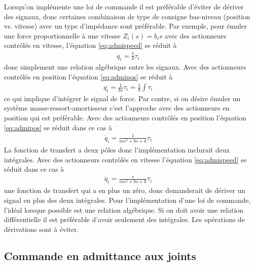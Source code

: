 Lorsqu'on implémente une loi de commande il est préférable d'éviter de dériver des signaux, donc certaines combinaison de type de consigne bas-niveau (position vs. vitesse) avec un type d'impédance sont préférable. Par exemple, pour émuler une force proportionnelle à une vitesse $Z_i(s) = b_i s$ avec des actionneurs contrôlés en vitesse, l'équation \eqref{eq:admispeed} se réduit à 
\begin{align}
\dot{q}_i = \frac{1}{b} \tau_i
\end{align}
donc simplement une relation algébrique entre les signaux. Avec des actionneurs contrôlés en position l'équation \eqref{eq:admipos} se réduit à 
\begin{align}
q_i = \frac{1}{b s} \tau_i = \frac{1}{b} \int \tau_i
\end{align}
ce qui implique d'intégrer le signal de force. Par contre, si on désire émuler un système masse-ressort-amortisseur c'est l'approche avec des actionneurs en position qui est préférable. Avec des actionneurs contrôlés en position l'équation \eqref{eq:admipos} se réduit dans ce cas à  
\begin{align}
\dot{q}_i = \frac{1}{ms^2+bs+k} \tau_i
\end{align}
La fonction de transfert a deux pôles donc l'implémentation inclurait deux intégrales. Avec des actionneurs contrôlés en vitesse l'équation \eqref{eq:admispeed} se réduit dans ce cas à 
\begin{align}
\dot{q}_i = \frac{s}{ms^2+bs+k} \tau_i
\end{align}
une fonction de transfert qui a en plus un zéro, donc demanderait de dériver un signal en plus des deux intégrales. Pour l'implémentation d'une loi de commande, l'idéal lorsque possible est une relation algébrique. Si on doit avoir une relation différentielle il est préférable d'avoir seulement des intégrales. Les opérations de dérivations sont à éviter. 

\subsection{Commande en admittance aux joints}
\label{sec:jointadmcontrol}


